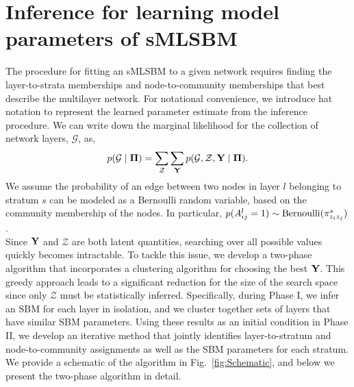 \section{Inference for learning model parameters of sMLSBM}
\indent The procedure for fitting an sMLSBM to a given network requires finding the layer-to-strata memberships and node-to-community memberships that best describe the multilayer network. For notational convenience, we introduce hat notation to represent the learned parameter estimate from the inference procedure. We can write down the marginal likelihood for the collection of network layers, $\mathcal{G}$, as,
\begin{equation}
\label{eq1}
p(\mathcal{G}\mid {\boldsymbol \Pi})=\sum_{\mathcal Z}\sum_{{\bf Y}}p(\mathcal{G},{\mathcal Z},{\bf Y} \mid {\boldsymbol \Pi}).
\end{equation}
We assume the probability of an edge between two nodes in layer $l$ belonging to stratum $s$ can be modeled as a Bernoulli random variable, based on the community membership of the nodes. In particular, $p({A}^{l}_{ij}=1)\sim \text{Bernoulli}({\bf \pi}_{z_{i}z_{j}}^{s})$. \\
\indent Since ${\bf Y}$ and ${\mathcal Z}$ are both latent quantities, searching over all possible values quickly becomes intractable. To tackle this issue, we develop a two-phase algorithm that incorporates a clustering algorithm for choosing the best $\bf Y$. This greedy approach leads to a significant reduction for the size of the search space since only $\mathcal Z$ must be statistically inferred. Specifically, during Phase I, we infer an SBM for each layer in isolation, and we cluster together sets of layers that have similar SBM parameters. Using these results as an initial condition in Phase II, we develop an iterative method that jointly identifies layer-to-stratum and node-to-community assignments as well as the SBM parameters for each stratum. We provide a schematic of the algorithm in Fig.~\ref{fig:Schematic}, and below we present the two-phase algorithm in detail.

